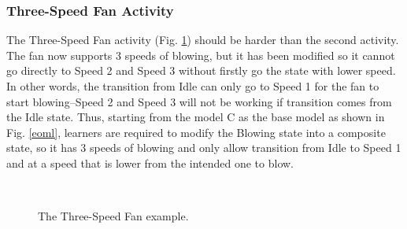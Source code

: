 \documentclass[conference]{IEEEtran}
\begin{document}
\subsubsection{Three-Speed Fan Activity}
The Three-Speed Fan activity (Fig. \ref{example-03}) should be harder than the second activity. The fan now supports 3 speeds of blowing, but it has been modified so it cannot go directly to Speed 2 and Speed 3 without firstly go the state with lower speed. In other words, the transition from Idle can only go to Speed 1 for the fan to start blowing--Speed 2 and Speed 3 will not be working if transition comes from the Idle state. Thus, starting from the model C as the base model as shown in Fig. \ref{eoml}, learners are required to modify the Blowing state into a composite state, so it has 3 speeds of blowing and only allow transition from Idle to Speed 1 and at a speed that is lower from the intended one to blow.

\begin{figure}[!t]
    \centering
    \\
	\caption{The Three-Speed Fan example.}
    \label{example-03}
\end{figure}
\end{document}
